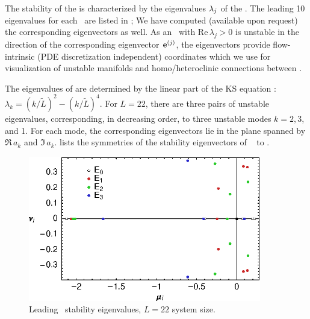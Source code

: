 The stability of the {\eqva} is characterized by the eigenvalues
$\eigExp[j]$ of the \stabmat.  The leading 10 eigenvalues for each
\eqv\ are listed in ;
We have computed (available upon request) the corresponding
eigenvectors as well. As an \eqv\ with $\mathrm{Re}\,
\lambda_j > 0$ is unstable in the direction of the
corresponding eigenvector $\jEigvec{j}$, the eigenvectors
provide flow-intrinsic (PDE discretization independent)
coordinates which we use for visualization of unstable
manifolds and homo/heteroclinic connections between \eqva.

The eigenvalues of  are determined by the linear part of the KS
equation : $\lambda_k=(k/\tilde{L})^2-(k/\tilde{L})^4$.
For $L=22$, there are three pairs of unstable eigenvalues, corresponding,
in decreasing order, to three unstable modes $k=2,3$, and 1.  For each
mode, the corresponding eigenvectors lie in the plane spanned by
$\Re \, a_k$ and $\Im \, a_k$. 
lists the symmetries of the stability eigenvectors of
\eqva\  to .

\begin{figure}[t]
\begin{center}
\includegraphics[width=4in]{figs/L22-eqvaEigenvalues.eps}
\end{center}
\caption{
Leading  \eqv\ stability eigenvalues,
$L=22$ system size.
}
\label{f:KS22EkEigs}
\end{figure}

